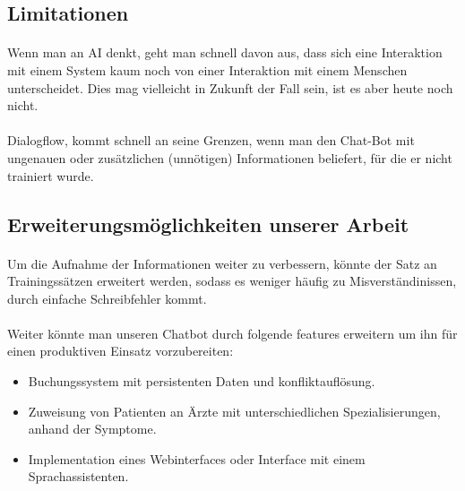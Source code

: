 \documentclass[11pt, letterpaper]{article}
\begin{document}
    \subsection{Limitationen}
        \paragraph{}
            Wenn man an AI denkt, geht man schnell davon aus, dass sich eine Interaktion mit einem System kaum noch von einer Interaktion mit einem
            Menschen unterscheidet. Dies mag vielleicht in Zukunft der Fall sein, ist es aber heute noch nicht. 
        \paragraph{}
            Dialogflow, kommt schnell an seine Grenzen, wenn man den Chat-Bot mit ungenauen oder zusätzlichen (unnötigen) Informationen beliefert,
            für die er nicht trainiert wurde. 
    \subsection{Erweiterungsmöglichkeiten unserer Arbeit}
        \paragraph{}
            Um die Aufnahme der Informationen weiter zu verbessern, könnte der Satz an Trainingssätzen erweitert werden, sodass es weniger häufig
            zu Misverständinissen, durch einfache Schreibfehler kommt.
        \paragraph{}
            Weiter könnte man unseren Chatbot durch folgende features erweitern um ihn für einen produktiven Einsatz vorzubereiten:
            \begin{itemize}
                \item Buchungssystem mit persistenten Daten und konfliktauflösung.
                \item Zuweisung von Patienten an Ärzte mit unterschiedlichen Spezialisierungen, anhand der Symptome.
                \item Implementation eines Webinterfaces oder Interface mit einem Sprachassistenten. 
            \end{itemize}
\end{document}
